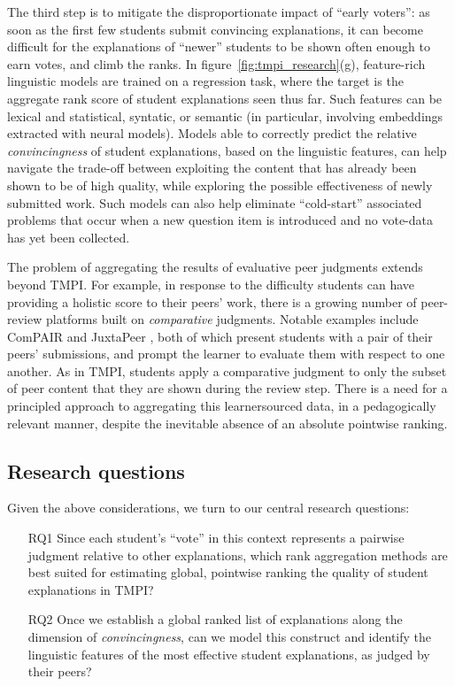 \documentclass[notitlepage,12pt]{jedm}
\begin{document}
The third step is to mitigate the disproportionate impact of ``early voters'': 
as soon as the first few students submit convincing explanations, it can 
become difficult for the explanations of ``newer'' students to be shown often enough to 
earn votes, and climb the ranks.
In figure~\ref{fig:tmpi_research}(g), feature-rich linguistic models are 
trained on a regression task, where the target is the aggregate rank score of 
student explanations seen thus far. Such features can be lexical and statistical, syntatic, or semantic (in particular, involving embeddings extracted with neural models).
Models able to correctly predict the relative \textit{convincingness} of 
student explanations, based on the linguistic features, can help navigate the 
trade-off between exploiting the content that has already been shown to be of 
high quality, while exploring the possible effectiveness of newly submitted 
work.
Such models can also help eliminate ``cold-start'' associated problems that 
occur when a new question item is introduced and no vote-data has yet been 
collected.

The problem of aggregating the results of evaluative peer judgments extends  
beyond TMPI.
For example, in response to the difficulty students can have providing a 
holistic score to their peers' work, there is a growing number of peer-review 
platforms built on \textit{comparative} judgments.
Notable examples include ComPAIR \cite{potter_compair:_2017} and 
JuxtaPeer \cite{cambre_juxtapeer:_2018},
both of which present students with 
a pair of their peers' submissions, and prompt the learner to evaluate 
them with respect to one another.
As in TMPI, students apply a comparative judgment to only the subset of peer 
content that they are shown during the review step.
There is a need for a principled approach to aggregating this learnersourced 
data, in a pedagogically relevant manner, despite the inevitable absence of 
an absolute pointwise ranking.

\subsection{Research questions}

Given the above considerations, we turn to our central research questions: 
\begin{itemize}
	\item[RQ1] Since each student's ``vote'' in this context represents a
	pairwise judgment relative to other explanations, which rank aggregation 
	methods are best suited for estimating global, pointwise ranking the quality of student 
	explanations in TMPI?
	\item[RQ2] Once we establish a global ranked list of explanations along the 
	dimension of \textit{convincingness}, can we model this construct and 
	identify the linguistic features of the most effective student 
	explanations, as judged by their peers?
\end{itemize}
\end{document}
